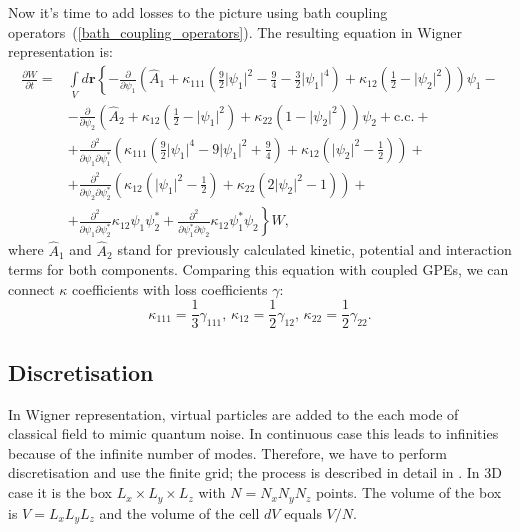 \documentclass[12pt,notitlepage]{report}
\begin{document}
Now it's time to add losses to the picture using bath coupling operators~(\ref{bath_coupling_operators}).
The resulting equation in Wigner representation is:
\begin{equation}
\label{full_wigner_equation}
\begin{split}
\frac{\partial W}{\partial t} = & \int\limits_V d\mathbf{r} \left\{ - \frac{\partial}{\partial \psi_1} \left( \hat{A}_1 +
\kappa_{111} \left( \frac{9}{2} \lvert \psi_1 \rvert^2 - \frac{9}{4} - \frac{3}{2} \lvert \psi_1 \rvert^4 \right) +
\kappa_{12} \left( \frac{1}{2} - \lvert \psi_2 \rvert^2 \right) \right) \psi_1 - \right. \\
& \left. - \frac{\partial}{\partial \psi_2} \left( \hat{A}_2 + \kappa_{12} \left( \frac{1}{2} - \lvert \psi_1 \rvert^2 \right) +
\kappa_{22} \left( 1 - \lvert \psi_2 \rvert^2 \right) \right) \psi_2 +  \textrm{c.c.} + \right. \\
& \left. + \frac{\partial^2}{\partial \psi_1 \partial \psi_1^*} \left( \kappa_{111} \left(\frac{9}{2} \lvert \psi_1 \rvert^4 -
9 \lvert \psi_1 \rvert^2 + \frac{9}{4} \right) + \kappa_{12} \left( \lvert \psi_2 \rvert^2 - \frac{1}{2} \right) \right) + \right. \\
& \left. + \frac{\partial^2}{\partial \psi_2 \partial \psi_2^*} \left( \kappa_{12} \left( \lvert \psi_1 \rvert^2 - \frac{1}{2} \right) +
\kappa_{22} \left( 2 \lvert \psi_2 \rvert^2 - 1 \right) \right) + \right. \\
& \left. + \frac{\partial^2}{\partial \psi_1 \partial \psi_2^*} \kappa_{12} \psi_1 \psi_2^* +
\frac{\partial^2}{\partial \psi_1^* \partial \psi_2} \kappa_{12} \psi_1^* \psi_2
\right\} W,
\end{split}
\end{equation}
where $\hat{A}_1$ and $\hat{A}_2$ stand for previously calculated kinetic, potential and interaction terms for both components.
Comparing this equation with coupled GPEs, we can connect $\kappa$ coefficients with loss coefficients $\gamma$:
\[
\kappa_{111} = \frac{1}{3} \gamma_{111},\,
\kappa_{12} = \frac{1}{2} \gamma_{12},\,
\kappa_{22} = \frac{1}{2} \gamma_{22}.
\]

\subsection*{Discretisation}

In Wigner representation, virtual particles are added to the each mode of classical field to mimic quantum noise.
In continuous case this leads to infinities because of the infinite number of modes.
Therefore, we have to perform discretisation and use the finite grid; the process is described in detail in \cite{0953-4075-35-17-301}.
In 3D case it is the box $L_x \times L_y \times L_z$ with $N = N_x N_y N_z$ points.
The volume of the box is $V = L_x L_y L_z$ and the volume of the cell $dV$ equals $V / N$.
\end{document}
